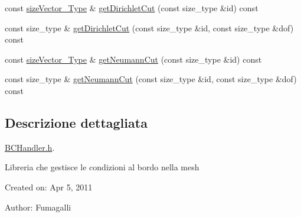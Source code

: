\begin{DoxyCompactItemize}
\item 
const \hyperlink{Core_8h_a83c51913d041a5001e8683434c09857f}{size\-Vector\-\_\-\-Type} \& \hyperlink{classBCHandler_a1efb6389dbecbcd38e53422ffc6f29c7}{get\-Dirichlet\-Cut} (const size\-\_\-type \&id) const 
\item 
const size\-\_\-type \& \hyperlink{classBCHandler_a390cb50c5fcbbf2e676fe7d5f5241180}{get\-Dirichlet\-Cut} (const size\-\_\-type \&id, const size\-\_\-type \&dof) const 
\item 
const \hyperlink{Core_8h_a83c51913d041a5001e8683434c09857f}{size\-Vector\-\_\-\-Type} \& \hyperlink{classBCHandler_a5e71b2adeaa281e88275bff504dc67d8}{get\-Neumann\-Cut} (const size\-\_\-type \&id) const 
\item 
const size\-\_\-type \& \hyperlink{classBCHandler_a726f1bfbc76113bbb3b5057b25a53871}{get\-Neumann\-Cut} (const size\-\_\-type \&id, const size\-\_\-type \&dof) const 
\end{DoxyCompactItemize}


\subsection{Descrizione dettagliata}
\hyperlink{BCHandler_8h}{B\-C\-Handler.\-h}. 

Libreria che gestisce le condizioni al bordo nella mesh

Created on\-: Apr 5, 2011

Author\-: Fumagalli 

